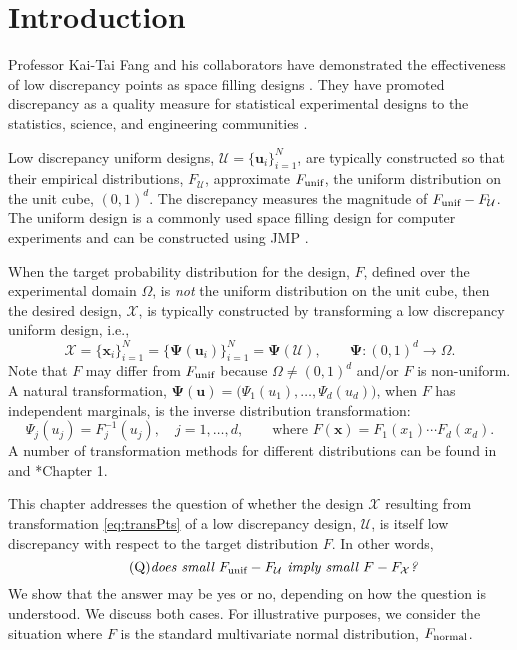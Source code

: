 \documentclass[graybox]{svmult}
\newcommand{\vx}{\boldsymbol{x}}
\newcommand{\vu}{\boldsymbol{u}}
\newcommand{\vPsi}{\boldsymbol{\Psi}}
\newcommand{\Udes}{\mathcal{U}}
\newcommand{\Xdes}{\mathcal{X}}
\newcommand{\Ftar}{F}
\newcommand{\cube}{\ensuremath{(0,1)^d}}
\newcommand{\unif}{\textup{unif}}
\newcommand{\normal}{\textup{normal}}
\begin{document}
\section{Introduction}

Professor Kai-Tai Fang and his collaborators have demonstrated the effectiveness of low discrepancy points as space filling designs \cites{FangHic07a, FangEtal19a, FanLiSud06, FanWan94}. 
They have promoted discrepancy as a quality measure for statistical experimental designs to the statistics, science, and engineering communities \cites{FanMa01b, FanMaWin02, FanMuk00, FanMa01a}. 

Low discrepancy uniform designs, $\Udes = \{\vu_i\}_{i=1}^N$, are typically constructed so that their empirical distributions, $F_\Udes$, approximate $F_\unif$, the uniform distribution on the unit cube, \cube.  
The discrepancy measures the magnitude of $F_\unif-F_\Udes$. 
The uniform design is a commonly used space filling design for computer experiments \cite{FanLiSud06} and can be constructed using  JMP\textsuperscript{\textregistered} \cite{sall2012jmp}.

When the target probability distribution for the design, $\Ftar$, defined over the experimental domain $\Omega$, is \emph{not} the uniform distribution on the unit cube, then the desired design, $\Xdes$, is typically constructed by transforming a low discrepancy uniform design, i.e., 
\begin{equation} \label{eq:transPts}
\Xdes = \{\vx_i\}_{i=1}^N = \{\vPsi(\vu_i)\}_{i=1}^N = \vPsi(\Udes), \qquad \vPsi: \cube \to \Omega.
\end{equation}
Note that $\Ftar$ may differ from $F_\unif$ because $\Omega \ne \cube$ and/or $\Ftar$ is non-uniform.  
A natural transformation, $\vPsi(\vu)=\bigl(\Psi_1(u_1),\ldots,\Psi_d(u_d) \bigr)$, when $\Ftar$ has independent marginals, is the inverse distribution transformation:
\begin{equation}\label{eq:inverse}
\Psi_j(u_j) = F_j^{-1}(u_j), \quad j =1, \ldots, d, \qquad \text{where } \Ftar(\vx) = F_1(x_1) \cdots F_d(x_d).
\end{equation}
A number of transformation methods for different distributions can be found in \cite{DEVROYE200683} and \cite{FanWan94}*{Chapter 1}.

This chapter addresses the question of whether the design $\Xdes$ resulting from transformation \eqref{eq:transPts} of a low discrepancy design, $\Udes$, is itself low discrepancy with respect to the target distribution $\Ftar$. 
In other words, 
\begin{equation} \label{eq:BigQ} \tag{Q}
\text{\emph{does small $F_\unif - F_\Udes$ imply small $\Ftar - F_\Xdes$?}}
\end{equation}
We show that the answer may be yes or no, depending on how the question is understood.  
We discuss both cases.  
For illustrative purposes, we consider the situation where $\Ftar$ is the standard multivariate normal distribution, $F_\normal$.
\end{document}
